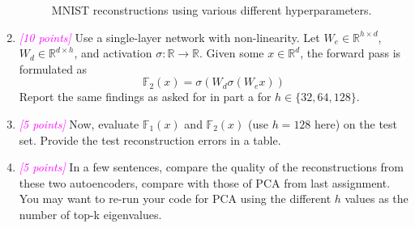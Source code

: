 \documentclass{article}
\newcommand{\field}[1]{\mathbb{#1}}
\newcommand{\1}{\mathbf{1}}
\newcommand{\R}{\field{R}} %
\newcommand{\F}{\field{F}} %
\newcommand{\points}[1]{\small\textcolor{magenta}{\emph{[#1 points]}} \normalsize}
\begin{document}
\begin{enumerate}
\begin{figure}[h!]
        \caption{MNIST reconstructions using various different hyperparameters.}
    \end{figure}
    
    \item \points{10} Use a single-layer network with non-linearity. Let $W_e\in\R^{h\times d}$,$W_d\in\R^{d\times h}$, and activation $\sigma:\R\rightarrow\R$. Given some $x\in\R^d$, the forward pass is formulated as 
    $$\F_2(x) = \sigma(W_d\sigma(W_ex))$$
    Report the same findings as asked for in part a for $h\in\{32,64,128\}$.
    
    \item \points{5} Now, evaluate $\F_1(x)$ and $\F_2(x)$ (use $h=128$ here) on the test set. Provide the test reconstruction errors in a table.
    
    \item \points{5} In a few sentences, compare the quality of the reconstructions from these two autoencoders, compare with those of PCA from last assignment. You may want to re-run your code for PCA using the different $h$ values as the number of top-k eigenvalues.
\end{enumerate}
\end{document}
